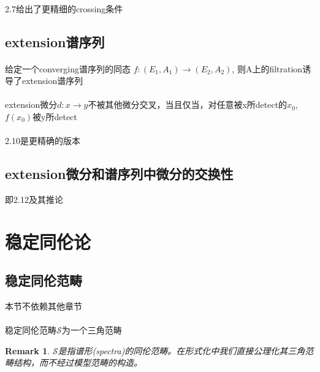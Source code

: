 \documentclass[12pt,a4paper]{article}
\newtheorem{rem}[equation]{Remark}
\begin{document}
\begin{sloppy}
\paragraph{}
2.7给出了更精细的crossing条件

\subsection{extension谱序列}

\paragraph{}
给定一个converging谱序列的同态
$f:(E_1,A_1)\xrightarrow{}(E_2,A_2)$, 则A上的filtration诱导了extension谱序列


\paragraph{} extension微分$d:x\xrightarrow{}y$不被其他微分交叉，当且仅当，对任意被x所detect的$x_0$, $f(x_0)$被y所detect

\paragraph{}
2.10是更精确的版本

\subsection{extension微分和谱序列中微分的交换性}

即2.12及其推论


\section{稳定同伦论}
\subsection{稳定同伦范畴}\label{3}

本节不依赖其他章节

\paragraph{}
稳定同伦范畴$\mathcal{S}$为一个三角范畴

\begin{rem}
    $\mathcal{S}$是指谱形(spectra)的同伦范畴。在形式化中我们直接公理化其三角范畴结构，而不经过模型范畴的构造。
\end{rem}


\end{sloppy}
\end{document}
